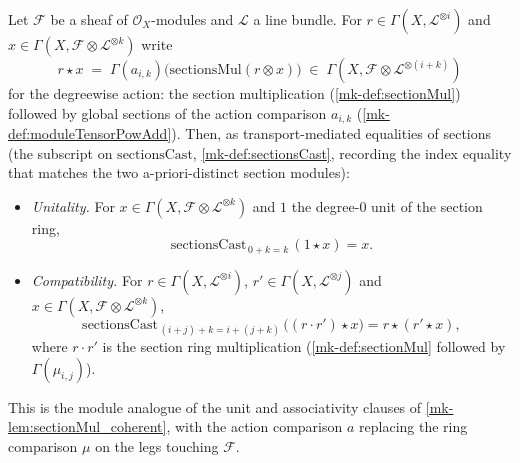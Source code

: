 \begin{lemma}
  \label{mk-lem:moduleSectionAction_coherent}
  \lean{}

  Let \(\mathcal{F}\) be a sheaf of \(\mathcal{O}_X\)-modules and \(\mathcal{L}\) a
  line bundle. For \(r\in\Gamma(X,\mathcal{L}^{\otimes i})\) and
  \(x\in\Gamma(X,\mathcal{F}\otimes\mathcal{L}^{\otimes k})\) write
  \[
    r\star x \;=\; \Gamma(a_{i,k})\bigl(\mathrm{sectionsMul}(r\otimes x)\bigr)
      \;\in\;\Gamma(X,\mathcal{F}\otimes\mathcal{L}^{\otimes(i+k)})
  \]
  for the degreewise action: the section multiplication (\ref{mk-def:sectionMul})
  followed by global sections of the action comparison \(a_{i,k}\)
  (\ref{mk-def:moduleTensorPowAdd}). Then, as transport-mediated equalities of sections
  (the subscript on \(\mathrm{sectionsCast}\), \ref{mk-def:sectionsCast}, recording the
  index equality that matches the two a-priori-distinct section modules):
  \begin{itemize}
    \item \emph{Unitality.} For \(x\in\Gamma(X,\mathcal{F}\otimes
      \mathcal{L}^{\otimes k})\) and \(1\) the degree-\(0\) unit of the section ring,
      \[ \mathrm{sectionsCast}_{\,0+k=k}\,(1\star x) = x. \]
    \item \emph{Compatibility.} For \(r\in\Gamma(X,\mathcal{L}^{\otimes i})\),
      \(r'\in\Gamma(X,\mathcal{L}^{\otimes j})\) and
      \(x\in\Gamma(X,\mathcal{F}\otimes\mathcal{L}^{\otimes k})\),
      \[ \mathrm{sectionsCast}_{\,(i+j)+k=i+(j+k)}\,\bigl((r\cdot r')\star x\bigr)
        = r\star(r'\star x), \]
      where \(r\cdot r'\) is the section ring multiplication (\ref{mk-def:sectionMul}
      followed by \(\Gamma(\mu_{i,j})\)).
  \end{itemize}
  This is the module analogue of the unit and associativity clauses of
  \ref{mk-lem:sectionMul_coherent}, with the action comparison \(a\) replacing the
  ring comparison \(\mu\) on the legs touching \(\mathcal{F}\).
\end{lemma}

